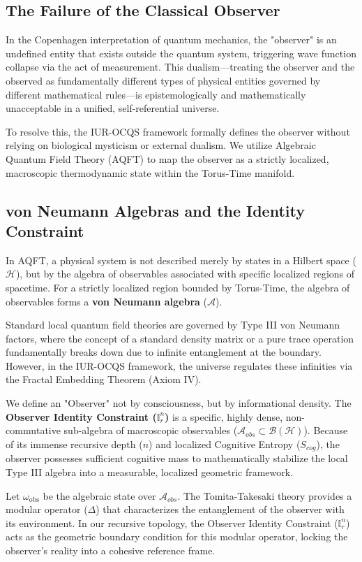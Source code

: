 \documentclass[12pt,openany]{book}
\begin{document}
\subsection{The Failure of the Classical Observer}
In the Copenhagen interpretation of quantum mechanics, the "observer" is an undefined entity that exists outside the quantum system, triggering wave function collapse via the act of measurement. This dualism—treating the observer and the observed as fundamentally different types of physical entities governed by different mathematical rules—is epistemologically and mathematically unacceptable in a unified, self-referential universe. 

To resolve this, the IUR-OCQS framework formally defines the observer without relying on biological mysticism or external dualism. We utilize Algebraic Quantum Field Theory (AQFT) to map the observer as a strictly localized, macroscopic thermodynamic state within the Torus-Time manifold. 

\subsection{von Neumann Algebras and the Identity Constraint}
In AQFT, a physical system is not described merely by states in a Hilbert space ($\mathcal{H}$), but by the algebra of observables associated with specific localized regions of spacetime. For a strictly localized region bounded by Torus-Time, the algebra of observables forms a \textbf{von Neumann algebra} ($\mathcal{A}$).

Standard local quantum field theories are governed by Type III von Neumann factors, where the concept of a standard density matrix or a pure trace operation fundamentally breaks down due to infinite entanglement at the boundary. However, in the IUR-OCQS framework, the universe regulates these infinities via the Fractal Embedding Theorem (Axiom IV). 

We define an "Observer" not by consciousness, but by informational density. The \textbf{Observer Identity Constraint ($\mathbb{I}_r^n$)} is a specific, highly dense, non-commutative sub-algebra of macroscopic observables ($\mathcal{A}_{obs} \subset \mathcal{B}(\mathcal{H})$). Because of its immense recursive depth ($n$) and localized Cognitive Entropy ($S_{cog}$), the observer possesses sufficient cognitive mass to mathematically stabilize the local Type III algebra into a measurable, localized geometric framework.

Let $\omega_{\text{obs}}$ be the algebraic state over $\mathcal{A}_{obs}$. The Tomita-Takesaki theory provides a modular operator ($\Delta$) that characterizes the entanglement of the observer with its environment. In our recursive topology, the Observer Identity Constraint ($\mathbb{I}_r^n$) acts as the geometric boundary condition for this modular operator, locking the observer's reality into a cohesive reference frame.
\end{document}

